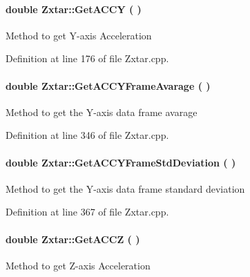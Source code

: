 \begin{appendices}
\paragraph[{\-Get\-A\-C\-C\-Y}]{\setlength{\rightskip}{0pt plus 5cm}double {\bf \-Zxtar\-::\-Get\-A\-C\-C\-Y} (
)}\label{class_zxtar_ae4a5f6a374a0bf48e62a8066509ddd95}
\-Method to get \-Y-\/axis \-Acceleration 

\-Definition at line 176 of file \-Zxtar.\-cpp.

\paragraph[{\-Get\-A\-C\-C\-Y\-Frame\-Avarage}]{\setlength{\rightskip}{0pt plus 5cm}double {\bf \-Zxtar\-::\-Get\-A\-C\-C\-Y\-Frame\-Avarage} (
)}\label{class_zxtar_a36337fe44ca204e5118ccb09247d2cf4}
\-Method to get the \-Y-\/axis data frame avarage 

\-Definition at line 346 of file \-Zxtar.\-cpp.

\paragraph[{\-Get\-A\-C\-C\-Y\-Frame\-Std\-Deviation}]{\setlength{\rightskip}{0pt plus 5cm}double {\bf \-Zxtar\-::\-Get\-A\-C\-C\-Y\-Frame\-Std\-Deviation} (
)}\label{class_zxtar_acdb9ddb50f7f932a5a28d9dac4454d0b}
\-Method to get the \-Y-\/axis data frame standard deviation 

\-Definition at line 367 of file \-Zxtar.\-cpp.

\paragraph[{\-Get\-A\-C\-C\-Z}]{\setlength{\rightskip}{0pt plus 5cm}double {\bf \-Zxtar\-::\-Get\-A\-C\-C\-Z} (
)}\label{class_zxtar_a457606063c02dac5bd51c570f52d17e9}
\-Method to get \-Z-\/axis \-Acceleration 


\end{appendices}

